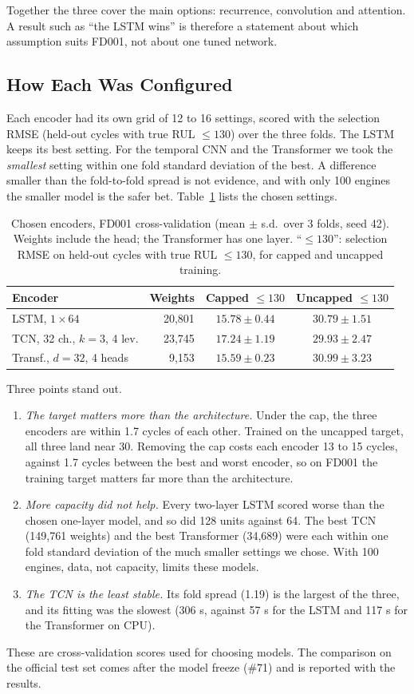Together the three cover the main options: recurrence, convolution and
attention. A result such as ``the LSTM wins'' is therefore a statement about
which assumption suits FD001, not about one tuned network.

\subsection{How Each Was Configured}
Each encoder had its own grid of 12 to 16 settings, scored with the
selection RMSE (held-out cycles with true RUL $\leq130$) over the three folds.
The LSTM keeps its best setting. For the temporal CNN and the Transformer we
took the \emph{smallest} setting within one fold standard deviation of the
best. A difference smaller than the fold-to-fold spread is not evidence, and
with only 100 engines the smaller model is the safer bet.
Table~\ref{tab:arch_choice} lists the chosen settings.

\begin{table}[t]
\centering
\caption{Chosen encoders, FD001 cross-validation (mean $\pm$ s.d.\ over 3 folds,
seed 42). Weights include the head; the Transformer has one layer. ``$\leq130$'': selection RMSE on held-out
cycles with true RUL $\leq130$, for capped and uncapped training.}
\label{tab:arch_choice}
\footnotesize
\setlength{\tabcolsep}{3pt}
\begin{tabular}{lrcc}
\hline
Encoder & Weights & Capped $\leq130$ & Uncapped $\leq130$ \\
\hline
LSTM, $1\times64$ & 20,801 & $15.78\pm0.44$ & $30.79\pm1.51$ \\
TCN, 32 ch., $k{=}3$, 4 lev. & 23,745 & $17.24\pm1.19$ & $29.93\pm2.47$ \\
Transf., $d{=}32$, 4 heads & 9,153 & $15.59\pm0.23$ & $30.99\pm3.23$ \\
\hline
\end{tabular}
\end{table}

Three points stand out.
\begin{enumerate}
\item \emph{The target matters more than the architecture.} Under the cap,
the three encoders are within 1.7 cycles of each other. Trained on the
uncapped target, all three land near 30. Removing the cap costs each encoder
13 to 15 cycles, against 1.7 cycles between the best and worst encoder, so on
FD001 the training target matters far more than the architecture.
\item \emph{More capacity did not help.} Every two-layer LSTM scored worse
than the chosen one-layer model, and so did 128 units against 64. The best
TCN (149,761 weights) and the best Transformer (34,689) were each within one
fold standard deviation of the much smaller settings we chose. With 100
engines, data, not capacity, limits these models.
\item \emph{The TCN is the least stable.} Its fold spread (1.19) is the
largest of the three, and its fitting was the slowest (306 s, against 57 s for
the LSTM and 117 s for the Transformer on CPU).
\end{enumerate}
These are cross-validation scores used for choosing models. The comparison on
the official test set comes after the model freeze (\#71) and is reported
with the results.

